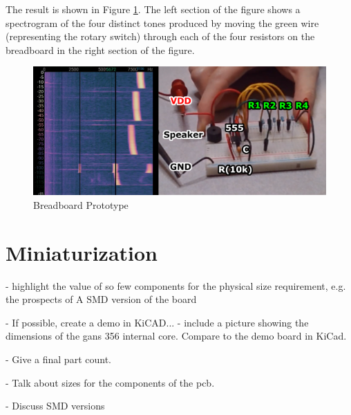 The result is shown in Figure \ref{fig:breadboard}. The left section of
the figure shows a spectrogram of the four distinct tones produced by
moving the green wire (representing the rotary switch) through each of
the four resistors on the breadboard in the right section of the figure.

\begin{figure}[h]
    \centering
    \caption{Breadboard Prototype}
    \label{fig:breadboard}
    \includegraphics[width=\linewidth]{Figures/6 PCB Design/breadboard_spectrogram.png}
\end{figure}


\section{Miniaturization}

- highlight the value of so few components for the physical size
requirement, e.g. the prospects of A SMD version of the board

- If possible, create a demo in KiCAD...
- include a picture showing the dimensions of the gans 356 internal
core. Compare to the demo board in KiCad.

- Give a final part count.

- Talk about sizes for the components of the pcb.

- Discuss SMD versions

